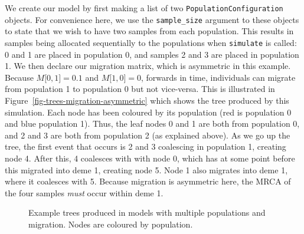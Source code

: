 \documentclass[graybox]{svmult}
\begin{document}
We create our model by first making a list of two
\texttt{PopulationConfiguration} objects. For convenience here, we use
the \texttt{sample\_size} argument to these objects to state that we
wish to have two samples from each population. This results in samples
being allocated sequentially to the populations when \texttt{simulate}
is called: 0 and 1 are placed in population 0, and samples 2 and 3 are
placed in population 1. We then declare our migration matrix, which is
asymmetric in this example. Because ${M{[}0,1{]} = 0.1}$ and
${M{[}1, 0{]} = 0}$, forwards in time, individuals can migrate
from population 1 to population 0 but not vice-versa. This is illustrated in
Figure~\ref{fig-trees-migration-asymmetric} which shows the tree
produced by this simulation. Each node has been coloured by its
population (red is population 0 and blue population 1). Thus, the leaf
nodes 0 and 1 are both from population 0, and 2 and 3 are both from
population 2 (as explained above). As we go up the tree, the first event
that occurs is 2 and 3 coalescing in population 1, creating node 4.
After this, 4 coalesces with with node 0, which has at some point before
this migrated into deme 1, creating node 5. Node 1 also migrates into
deme 1, where it coalesces with 5. Because migration is asymmetric here,
the MRCA of the four samples \emph{must} occur
within deme 1.

\begin{figure}[t]
\centering
{}
\qquad\qquad
{}
\caption{\label{fig-trees-migration} Example trees produced in models with multiple
populations and migration. Nodes are coloured by population.}
\end{figure}
\end{document}
